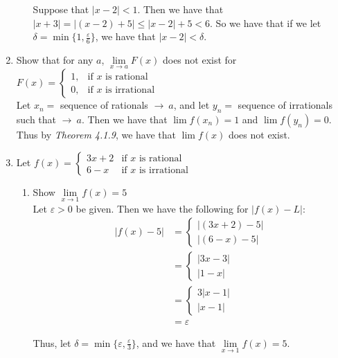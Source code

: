 \documentclass[12pt,letterpaper]{article}
\theoremstyle{case}
\theoremstyle{definition}
\begin{document}
\begin{enumerate}
\begin{enumerate}
			Suppose that $|x-2|<1$. Then we have that $|x+3|=|(x-2)+5|\leq |x-2|+5 < 6$. So we have that if we let $\delta=\min \{1,\frac{\varepsilon}{6}\}$, we have that $|x-2|<\delta$.
		\end{enumerate}

	\item Show that for any $a$, $\lim\limits_{x \to a} F(x)$ does not exist for $F(x) = \begin{cases}
		1, & \text{if } x \text{ is rational} \\
		0, & \text{if } x \text{ is irrational}
	\end{cases}$\\
	
	Let $x_n=$ sequence of rationals $\rightarrow\ a$, and let $y_n=$ sequence of irrationals such that $\rightarrow\ a$. Then we have that $\lim f(x_n)=1$ and $\lim f(y_n)=0$. Thus by \textit{Theorem 4.1.9}, we have that $\lim f(x)$ does not exist.
	
	\item Let $f(x)=\begin{cases}
	3x+2 & \text{if } x \text{ is rational} \\
	6-x & \text{if } x \text{ is irrational}
	\end{cases}$
		\begin{enumerate}
			\item Show $\lim\limits_{x \to 1} f(x)=5$\\
			
			Let $\varepsilon>0$ be given. Then we have the following for $|f(x)-L|$:
			\begin{align*}
				|f(x)-5| &= \begin{cases}
					|(3x+2)-5| \\
					|(6-x)-5|
				\end{cases} \\
				&= \begin{cases}
					|3x-3| \\
					|1-x|
				\end{cases}\\
				&= \begin{cases}
					3|x-1| \\
					|x-1|
				\end{cases} \\
				&= \varepsilon
			\end{align*}
			
			Thus, let $\delta=\min \{\varepsilon, \frac{\varepsilon}{3}\}$, and we have that $\lim\limits_{x \to 1} f(x)=5$.
			

\end{enumerate}
\end{enumerate}
\end{document}
